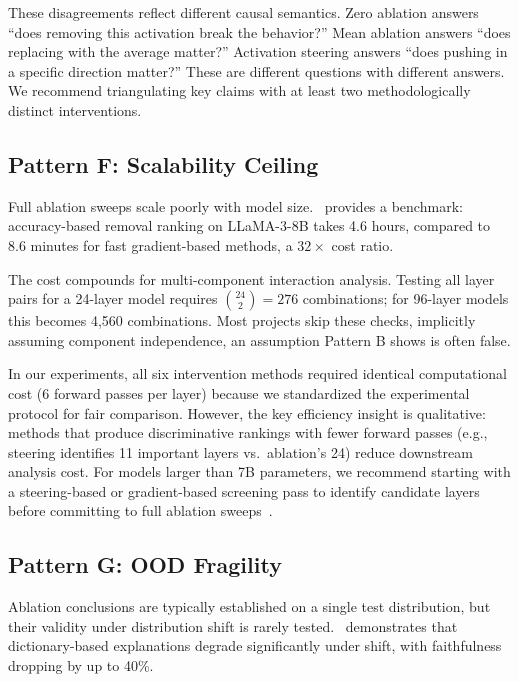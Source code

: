\documentclass[pdflatex,sn-mathphys-num]{sn-jnl}
\begin{document}
These disagreements reflect different causal semantics. Zero ablation answers ``does removing this activation break the behavior?'' Mean ablation answers ``does replacing with the average matter?'' Activation steering answers ``does pushing in a specific direction matter?'' These are different questions with different answers. We recommend triangulating key claims with at least two methodologically distinct interventions.

\subsection{Pattern F: Scalability Ceiling}
\label{sec:patternF}

Full ablation sweeps scale poorly with model size.~\cite{Hinostroza2026} provides a benchmark: accuracy-based removal ranking on LLaMA-3-8B takes 4.6 hours, compared to 8.6 minutes for fast gradient-based methods, a $32\times$ cost ratio.

The cost compounds for multi-component interaction analysis. Testing all layer pairs for a 24-layer model requires ${24 \choose 2} = 276$ combinations; for 96-layer models this becomes 4,560 combinations. Most projects skip these checks, implicitly assuming component independence, an assumption Pattern B shows is often false.

In our experiments, all six intervention methods required identical computational cost (6 forward passes per layer) because we standardized the experimental protocol for fair comparison. However, the key efficiency insight is qualitative: methods that produce discriminative rankings with fewer forward passes (e.g., steering identifies 11 important layers vs.\ ablation's 24) reduce downstream analysis cost. For models larger than 7B parameters, we recommend starting with a steering-based or gradient-based screening pass to identify candidate layers before committing to full ablation sweeps~\cite{Hinostroza2026}.

\subsection{Pattern G: OOD Fragility}
\label{sec:patternG}

Ablation conclusions are typically established on a single test distribution, but their validity under distribution shift is rarely tested.~\cite{Lima2026} demonstrates that dictionary-based explanations degrade significantly under shift, with faithfulness dropping by up to 40\%.
\end{document}
